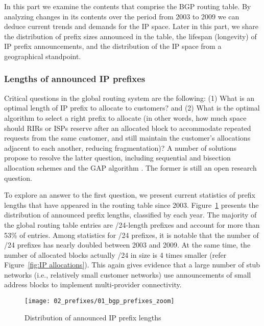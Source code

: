 In this part we examine the contents that comprise the BGP routing table. By
analyzing changes in its contents over the period from 2003 to 2009 we can
deduce current trends and demands for the IP space. Later in this part, we
share the distribution of prefix sizes announced in the table, the lifespan
(longevity) of IP prefix announcements, and the distribution of the IP space
from a geographical standpoint.

\subsubsection{Lengths of announced IP prefixes}

Critical questions in the global routing system are the following: (1) What is
an optimal length of IP prefix to allocate to customers? and (2) What is the
optimal algorithm to select a right prefix to allocate (in other words, how
much space should RIRs or ISPs reserve after an allocated block to accommodate
repeated requests from the same customer, and still maintain the customer's
allocations adjacent to each another, reducing fragmentation)? A number of
solutions propose to resolve the latter question, including sequential and
bisection allocation schemes and the GAP algorithm
\cite{Wang:2007:Reduce-IP-Address}. The former is still an open research
question.

To explore an answer to the first question, we present current statistics of
prefix lengths that have appeared in the routing table since 2003.
 Figure~\ref{fig:bgp prefix distribution} presents the distribution of
announced prefix lengths, classified by each year. The majority of the global
routing table entries are /24-length prefixes and account for more than 53\% of
entries. Among statistics for /24 prefixes, it is notable that the number of
/24 prefixes has nearly doubled between 2003 and 2009. At the same time, the
number of allocated blocks actually /24 in size is 4 times smaller (refer
Figure~\ref{fig:IP allocations}). This again gives evidence that a large number
of stub networks (i.e., relatively small customer networks) use announcements
of small address blocks to implement multi-provider connectivity.

\begin{figure}[htbp]
	\centering
		\texttt{[image: 02\_prefixes/01\_bgp\_prefixes\_zoom]}
	\caption{Distribution of announced IP prefix lengths}
	\label{fig:bgp prefix distribution}
\end{figure}

